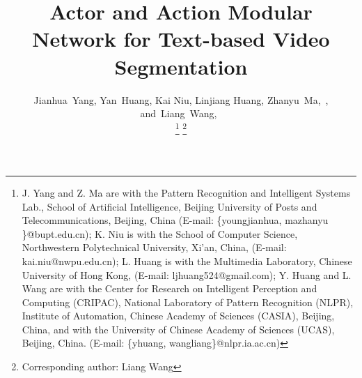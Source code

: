 \documentclass[journal]{IEEEtran}
\begin{document}
\title{Actor and Action Modular Network for Text-based Video Segmentation}


\author{Jianhua~Yang, Yan~Huang, Kai Niu, Linjiang Huang,
        Zhanyu~Ma,~,
        and~Liang~Wang\textsuperscript{\Letter},~


\thanks{J. Yang and Z. Ma are with the Pattern Recognition and Intelligent Systems Lab., School of Artificial Intelligence, Beijing University of Posts and Telecommunications, Beijing, China (E-mail: \{youngjianhua, mazhanyu \}@bupt.edu.cn); K. Niu is with the School of Computer Science, Northwestern Polytechnical University, Xi'an, China, (E-mail: kai.niu@nwpu.edu.cn); L. Huang is with the Multimedia Laboratory, Chinese University of Hong Kong, (E-mail: ljhuang524@gmail.com); Y. Huang and L. Wang are with the Center for Research on Intelligent
Perception and Computing (CRIPAC), National Laboratory of Pattern Recognition (NLPR), Institute of Automation, Chinese Academy of Sciences (CASIA), Beijing, China, and with the University of Chinese Academy of Sciences (UCAS), Beijing, China. (E-mail: \{yhuang, wangliang\}@nlpr.ia.ac.cn)}
\thanks{Corresponding author: Liang Wang}
}












\maketitle
\end{document}
